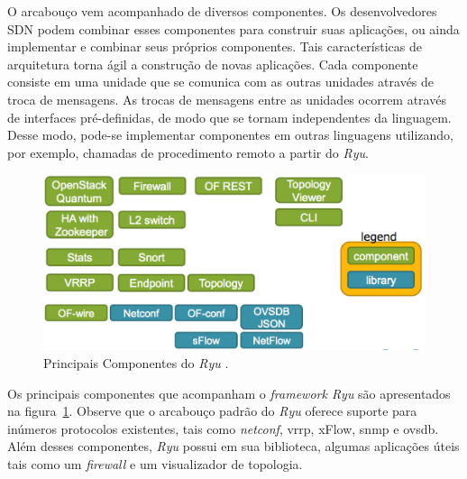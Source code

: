 \documentclass[	12pt, Times, openright, twoside, a4paper, english, brazil]{abntex2}
\newcommand{\bkc}[1]{{\color{blue}{#1}}} %
\begin{document}

O arcabouço vem acompanhado de diversos componentes. Os desenvolvedores SDN podem combinar esses componentes para construir suas aplicações, ou ainda implementar e combinar seus próprios componentes. Tais características de arquitetura torna ágil a construção de novas aplicações. Cada componente consiste em uma unidade que se comunica com as outras unidades através de troca de mensagens. As trocas de mensagens entre as unidades ocorrem através de interfaces pré-definidas, de modo que se tornam independentes da linguagem. Desse modo, pode-se implementar componentes em outras linguagens utilizando, por exemplo, chamadas de procedimento remoto a partir do \textit{Ryu}.

\begin{figure}[ht!]
    \begin{center}  
    \includegraphics[width=360pt]{ryu-components.jpg}
    \caption{Principais Componentes do \textit{Ryu} \cite{ryucomponentes}.}
    \label{fig:componentes-Ryu}
    \end{center}
\end{figure}

Os principais componentes que acompanham o \textit{framework Ryu} são apresentados na figura~\ref{fig:componentes-Ryu}. Observe que o arcabouço padrão do \textit{Ryu} oferece suporte para inúmeros protocolos existentes, tais como \textit{netconf}, vrrp, xFlow, snmp e ovsdb. Além desses componentes, \textit{Ryu} possui em sua biblioteca, algumas aplicações úteis tais como um \textit{firewall} e um visualizador de topologia.
\end{document}
